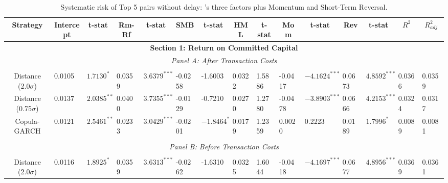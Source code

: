 \documentclass[a4paper]{article}
\begin{document}
		\begin{sidewaystable}
		\caption{Systematic risk of Top 5 pairs without delay: \citet*{ff93}'s three factors plus Momentum and Short-Term Reversal.}
		\begin{threeparttable}[H]
			\centering \scriptsize
			\begin{tabularx}{\textwidth}{@{\extracolsep{\fill}}lllllllllllllll@{}}
				\toprule
				\multicolumn{1}{c}{Strategy} & \multicolumn{1}{c}{Intercept} & \multicolumn{1}{c}{t-stat} & \multicolumn{1}{c}{Rm-Rf} & \multicolumn{1}{c}{t-stat} & \multicolumn{1}{c}{SMB} & \multicolumn{1}{c}{t-stat} & \multicolumn{1}{c}{HML} & \multicolumn{1}{c}{t-stat} & \multicolumn{1}{c}{Mom} & \multicolumn{1}{c}{t-stat} & \multicolumn{1}{c}{Rev} & \multicolumn{1}{c}{t-stat} & \multicolumn{1}{c}{$R^{2}$} & \multicolumn{1}{c}{$R^{2}_{adj}$} \\
				\midrule
				\multicolumn{15}{c}{\textbf{Section 1: Return on Committed Capital}} \\
				\multicolumn{15}{c}{\textit{Panel A: After Transaction Costs}} \\
				\multicolumn{1}{c}{} & \multicolumn{1}{c}{} & \multicolumn{1}{c}{} & \multicolumn{1}{c}{} & \multicolumn{1}{c}{} & \multicolumn{1}{c}{} & \multicolumn{1}{c}{} & \multicolumn{1}{c}{} &       &       &       &       &       &       &  \\
				\multicolumn{1}{c}{Distance (2.0$\sigma$)} & 0.0105 & $1.7130^{*}$ & 0.0359 & $3.6379^{***}$ & -0.0258 & -1.6003 & 0.0322 & 1.5886 & -0.0417 & $-4.1624^{***}$ & 0.0673 & $4.8592^{***}$ & 0.0366 & 0.0359 \\
				\multicolumn{1}{c}{Distance (0.75$\sigma$)} & 0.0137 & $2.0385^{**}$ & 0.0400 & $3.7355^{***}$ & -0.0129 & -0.7210 & 0.0270 & 1.2780 & -0.0478 & $-3.8903^{***}$ & 0.0666 & $4.2153^{***}$ & 0.0324 & 0.0317 \\
				\multicolumn{1}{c}{Copula-GARCH} & 0.0121 & $2.5461^{**}$ & 0.0233 & $3.0429^{***}$ & -0.0201 & $-1.8464^{*}$ & 0.0179 & 1.2359 & 0.0020 & 0.2223 & 0.0189 & $1.7996^{*}$ & 0.0089 & 0.0081  \\
				&       &       &       &       &       &       &       &       &       &       &       &       &       &  \\
				\multicolumn{15}{c}{\textit{Panel B: Before Transaction Costs}} \\
				&       &       &       &       &       &       &       &       &       &       &       &       &       &  \\
				\multicolumn{1}{c}{Distance (2.0$\sigma$)}& 0.0116 & $1.8925^{*}$ & 0.0359 & $3.6313^{***}$ & -0.0262 & -1.6310 & 0.0325 & 1.6044 & -0.0418 & $-4.1697^{***}$ & 0.0677 & $4.8956^{***}$ & 0.0369 & 0.0361 \\

\end{tabularx}
\end{threeparttable}
\end{sidewaystable}
\end{document}
